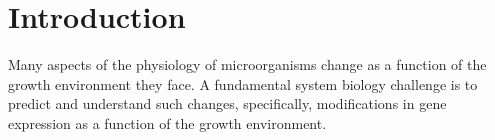 \section{Introduction}
Many aspects of the physiology of microorganisms change as a function of the growth environment they face.
A fundamental system biology challenge is to predict and understand such changes, specifically, modifications in gene expression as a function of the growth environment.